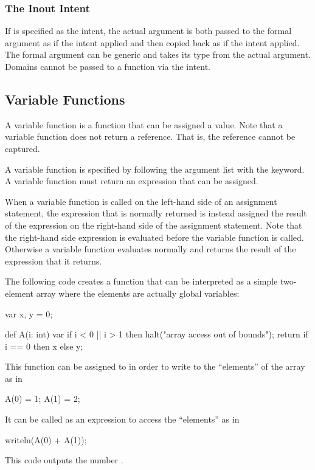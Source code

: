 \subsubsection{The Inout Intent}
\label{The_Inout_Intent}

If  is specified as the intent, the actual argument is
both passed to the formal argument as if the  intent applied
and then copied back as if the  intent applied.  The formal
argument can be generic and takes its type from the actual argument.
Domains cannot be passed to a function via the  intent.

\subsection{Variable Functions}
\label{Variable_Functions}

A variable function is a function that can be assigned a value.  Note
that a variable function does not return a reference.  That is, the
reference cannot be captured.

A variable function is specified by following the argument list with
the  keyword.  A variable function must return an expression
that can be assigned.

When a variable function is called on the left-hand side of an
assignment statement, the expression that is normally returned is
instead assigned the result of the expression on the right-hand side
of the assignment statement.  Note that the right-hand side expression
is evaluated before the variable function is called.  Otherwise a
variable function evaluates normally and returns the result of the
expression that it returns.

\begin{example}
The following code creates a function that can be interpreted as a
simple two-element array where the elements are actually global
variables:
\begin{chapel}
var x, y = 0;

def A(i: int) var {
  if i < 0 || i > 1 then
    halt("array access out of bounds");
  return if i == 0 then x else y;
}
\end{chapel}
This function can be assigned to in order to write to the ``elements''
of the array as in
\begin{chapel}
A(0) = 1;
A(1) = 2;
\end{chapel}
It can be called as an expression to access the ``elements'' as in
\begin{chapel}
writeln(A(0) + A(1));
\end{chapel}
This code outputs the number .
\end{example}

